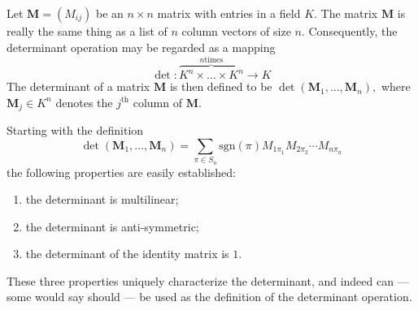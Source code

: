 \documentclass[12pt]{article}
\newcommand{\supth}{^{\text{th}}}
\newcommand{\mM}{\mathbf{M}}
\begin{document}
Let $\mM = (M_{ij})$ be an $n\times n$ matrix with entries in a field
$K$. The matrix $\mM$ is really the same thing as a list of $n$ column
vectors of size $n$. Consequently, the determinant operation may be
regarded as a mapping
$$\det:\overbrace{K^n\times\ldots\times K^n}^{n \mbox{
    times}}\rightarrow K$$
The determinant of a matrix $\mM$ is then defined to be 
$\det(\mM_1,\ldots,\mM_n),$
where $\mM_j\in K^n$ denotes the $j\supth$ column of $\mM$.

Starting with the definition
\begin{equation}
\label{eq:detdef}
\det(\mM_1,\ldots,\mM_n) = \sum_{\pi\in S_n} \mathrm{sgn}(\pi) M_{1\pi_1}
M_{2\pi_2}\cdots  
M_{n\pi_n}
\end{equation}
the following properties are easily established:
\begin{enumerate}
\item the determinant is multilinear;
\item the determinant is anti-symmetric;
\item the determinant of the identity matrix is $1$.
\end{enumerate}
These three properties uniquely characterize the determinant, and
indeed can --- some would say should --- be used as the definition of
the determinant operation.
\end{document}
